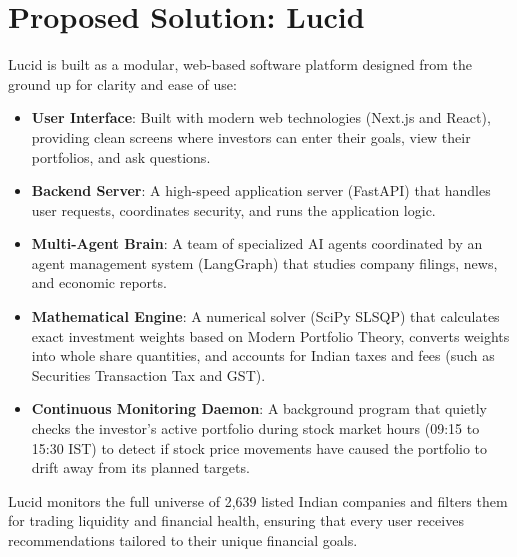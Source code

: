 \section{Proposed Solution: Lucid}
Lucid is built as a modular, web-based software platform designed from the ground up for clarity and ease of use:
\begin{itemize}
    \item \textbf{User Interface}: Built with modern web technologies (Next.js and React), providing clean screens where investors can enter their goals, view their portfolios, and ask questions.
    \item \textbf{Backend Server}: A high-speed application server (FastAPI) that handles user requests, coordinates security, and runs the application logic.
    \item \textbf{Multi-Agent Brain}: A team of specialized AI agents coordinated by an agent management system (LangGraph) that studies company filings, news, and economic reports.
    \item \textbf{Mathematical Engine}: A numerical solver (SciPy SLSQP) that calculates exact investment weights based on Modern Portfolio Theory, converts weights into whole share quantities, and accounts for Indian taxes and fees (such as Securities Transaction Tax and GST).
    \item \textbf{Continuous Monitoring Daemon}: A background program that quietly checks the investor's active portfolio during stock market hours (09:15 to 15:30 IST) to detect if stock price movements have caused the portfolio to drift away from its planned targets.
\end{itemize}

Lucid monitors the full universe of 2,639 listed Indian companies and filters them for trading liquidity and financial health, ensuring that every user receives recommendations tailored to their unique financial goals.

